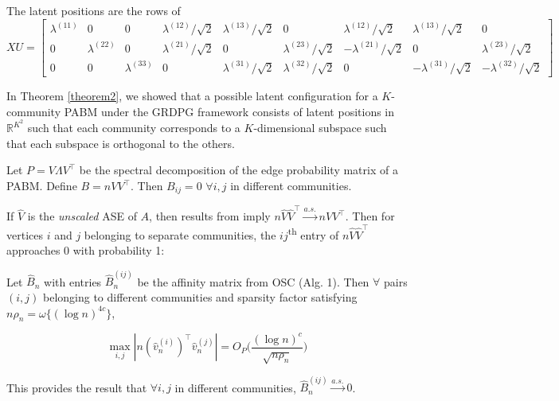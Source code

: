 \documentclass[
  11pt,
]{article}
\begin{document}
\begin{example}[$K = 3$]
The latent positions are the rows of  
$$XU = \begin{bmatrix}
  \lambda^{(11)} & 0 & 0 & 
  \lambda^{(12)} / \sqrt{2} & \lambda^{(13)} / \sqrt{2} & 0 & 
  \lambda^{(12)} / \sqrt{2} & \lambda^{(13)} / \sqrt{2} & 0 \\
  0 & \lambda^{(22)} & 0 & 
  \lambda^{(21)} / \sqrt{2} & 0 & \lambda^{(23)} / \sqrt{2} & 
  -\lambda^{(21)} / \sqrt{2} & 0 & \lambda^{(23)} / \sqrt{2} \\
  0 & 0 & \lambda^{(33)} & 
  0 & \lambda^{(31)} / \sqrt{2} & \lambda^{(32)} / \sqrt{2} & 
  0 & -\lambda^{(31)} / \sqrt{2} & -\lambda^{(32)} / \sqrt{2}
\end{bmatrix}$$
\end{example}

In Theorem \ref{theorem2}, we showed that a possible latent
configuration for a \(K\)-community PABM under the GRDPG framework
consists of latent positions in \(\mathbb{R}^{K^2}\) such that each
community corresponds to a \(K\)-dimensional subspace such that each
subspace is orthogonal to the others.

\begin{theorem}
\label{osc}
Let $P = V \Lambda V^\top$ be the spectral decomposition of the edge probability matrix of a PABM. Define $B = n V V^\top$. Then $B_{ij} = 0$ $\forall i, j$ in different communities. 
\end{theorem}

If \(\hat{V}\) is the \emph{unscaled} ASE of \(A\), then results from
\citeauthor{rubindelanchy2017statistical} imply
\(n \hat{V} \hat{V}^\top \stackrel{a.s.}{\to} n V V^\top\). Then for
vertices \(i\) and \(j\) belonging to separate communities, the
\(ij\)\textsuperscript{th} entry of \(n \hat{V} \hat{V}^\top\)
approaches 0 with probability 1:

\begin{theorem}
\label{theorem4} 
Let $\hat{B}_n$ with entries $\hat{B}_n^{(ij)}$ be the affinity matrix from OSC 
(Alg. 1). Then $\forall$ pairs $(i, j)$ belonging to different communities 
and sparsity factor satisfying $n \rho_n = \omega\{(\log n)^{4c}\}$, 

\begin{equation} \label{eq:thm4}
\max_{i, j} |n (\hat{v}_n^{(i)})^\top \hat{v}_n^{(j)}| = 
O_P \Big( \frac{(\log n)^c}{\sqrt{n \rho_n}} \Big)
\end{equation}

This provides the result that $\forall i, j$ in different communities, 
$\hat{B}_n^{(ij)} \stackrel{a.s.}{\to} 0$.
\end{theorem}
\end{document}
